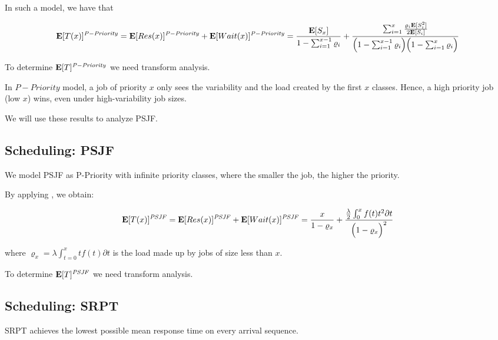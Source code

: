 In such a model, we have that

\begin{equation}
\label{eqn:P-Priority-Mean-Time-Size}
\expected{T(x)}^{\mathit{P-Priority}}=
\expected{Res(x)}^{\mathit{P-Priority}} + \expected{Wait(x)}^{\mathit{P-Priority}}=
\frac{\expected{S_{x}}}{1-\sum_{i=1}^{x-1}\varrho_{i}}+
\frac{\sum_{i=1}^{x}\frac{\varrho_{i}\expected{S_{i}^{2}}}{2\expected{S_{i}}}}
	 {\Big(1-\sum_{i=1}^{x-1}\varrho_{i}\Big)\Big(1-\sum_{i=1}^{x}\varrho_{i}\Big)}
\end{equation}

To determine $\mathbf{E}[T]^{\mathit{P-Priority}}$ we need transform analysis.

In $\mathit{P-Priority}$ model, a job of priority $x$ only sees the variability and the load created by the first $x$ classes. Hence, a high priority job (low $x$) wins, even under high-variability job sizes.

We will use these results to analyze PSJF.




\subsection{Scheduling: PSJF}
\label{sec:Scheduling-PSJF}

We model PSJF as P-Priority with infinite priority classes, where the smaller the job, the higher the priority.

By applying , we obtain:

\begin{equation}
\label{eqn:PSJF-Mean-Time-Size}
\expected{T(x)}^{\mathit{PSJF}}=
\expected{Res(x)}^{\mathit{PSJF}}+\expected{Wait(x)}^{\mathit{PSJF}}=
\frac{x}{1-\varrho_{x}}+
\frac{\frac{\lambda}{2}\int_{0}^{x}f(t)t^{2}\partial t}
{\Big(1-\varrho_{x}\Big)^{2}}
\end{equation}

where $\varrho_{x}=\lambda\int_{t=0}^{x}tf(t)\partial t$ is the load made up by jobs of size less than $x$.

To determine $\mathbf{E}[T]^{\mathit{PSJF}}$ we need transform analysis.




\subsection{Scheduling: SRPT}
\label{sec:Scheduling-SRPT}

SRPT achieves the lowest possible mean response time on every arrival sequence.

